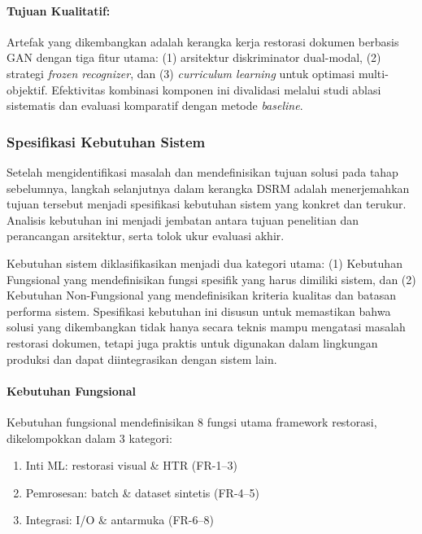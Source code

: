 \documentclass[12pt,a4paper]{article}
\begin{document}
\paragraph{Tujuan Kualitatif:}

Artefak yang dikembangkan adalah kerangka kerja restorasi dokumen berbasis GAN dengan tiga fitur utama: (1) arsitektur diskriminator dual-modal, (2) strategi \textit{frozen recognizer}, dan (3) \textit{curriculum learning} untuk optimasi multi-objektif. Efektivitas kombinasi komponen ini divalidasi melalui studi ablasi sistematis dan evaluasi komparatif dengan metode \textit{baseline}.

\subsubsection{Spesifikasi Kebutuhan Sistem}
\label{subsubsec:requirements-analysis}

Setelah mengidentifikasi masalah dan mendefinisikan tujuan solusi pada tahap sebelumnya, langkah selanjutnya dalam kerangka DSRM adalah menerjemahkan tujuan tersebut menjadi spesifikasi kebutuhan sistem yang konkret dan terukur. Analisis kebutuhan ini menjadi jembatan antara tujuan penelitian dan perancangan arsitektur, serta tolok ukur evaluasi akhir.

Kebutuhan sistem diklasifikasikan menjadi dua kategori utama: (1) Kebutuhan Fungsional yang mendefinisikan fungsi spesifik yang harus dimiliki sistem, dan (2) Kebutuhan Non-Fungsional yang mendefinisikan kriteria kualitas dan batasan performa sistem. Spesifikasi kebutuhan ini disusun untuk memastikan bahwa solusi yang dikembangkan tidak hanya secara teknis mampu mengatasi masalah restorasi dokumen, tetapi juga praktis untuk digunakan dalam lingkungan produksi dan dapat diintegrasikan dengan sistem lain.

\paragraph{Kebutuhan Fungsional}

Kebutuhan fungsional mendefinisikan 8 fungsi utama framework restorasi, dikelompokkan dalam 3 kategori:

\begin{enumerate}[label=(\alph*), nosep]
\item Inti ML: restorasi visual \& HTR (FR-1--3)
\item Pemrosesan: batch \& dataset sintetis (FR-4--5)
\item Integrasi: I/O \& antarmuka (FR-6--8)
\end{enumerate}
\end{document}
